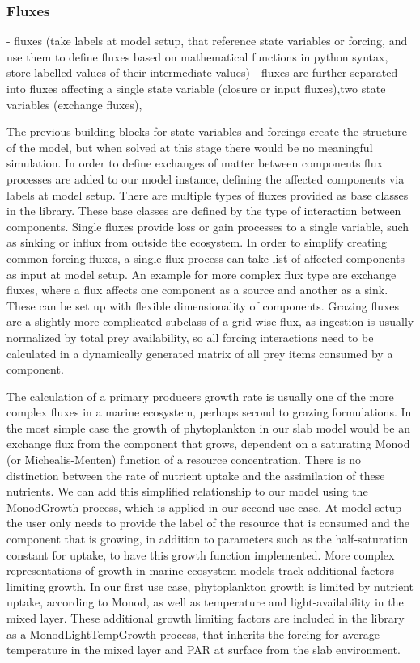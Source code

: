 \documentclass[journal abbreviations, manuscript]{copernicus}
\begin{document}
\subsubsection{Fluxes}

- fluxes (take labels at model setup, that reference state variables or forcing, and use them to define fluxes based on mathematical functions in python syntax, store labelled values of their intermediate values)
    - fluxes are further separated into fluxes affecting a single state variable (closure or input fluxes),two state variables (exchange fluxes),
    
The previous building blocks for state variables and forcings create the structure of the model, but when solved at this stage there would be no meaningful simulation. In order to define exchanges of matter between components flux processes are added to our model instance, defining the affected components via labels at model setup.
There are multiple types of fluxes provided as base classes in the library. These base classes are defined by the type of interaction between components. Single fluxes provide loss or gain processes to a single variable, such as sinking or influx from outside the ecosystem. In order to simplify creating common forcing fluxes, a single flux process can take list of affected components as input at model setup. An example for more complex flux type are exchange fluxes, where a flux affects one component as a source and another as a sink. These can be set up with flexible dimensionality of components. Grazing fluxes are a slightly more complicated subclass of a grid-wise flux, as ingestion is usually normalized by total prey availability, so all forcing interactions need to be calculated in a dynamically generated matrix of all prey items consumed by a component.

The calculation of a primary producers growth rate is usually one of the more complex fluxes in a marine ecosystem, perhaps second to grazing formulations. In the most simple case the growth of phytoplankton in our slab model would be an exchange flux from the component that grows, dependent on a saturating Monod (or Michealis-Menten) function of a resource concentration. There is no distinction between the rate of nutrient uptake and the assimilation of these nutrients. We can add this simplified relationship to our model using the MonodGrowth process, which is applied in our second use case. At model setup the user only needs to provide the label of the resource that is consumed and the component that is growing, in addition to parameters such as the half-saturation constant for uptake, to have this growth function implemented.
More complex representations of growth in marine ecosystem models track additional factors limiting growth. In our first use case, phytoplankton growth is limited by nutrient uptake, according to Monod, as well as temperature and light-availability in the mixed layer. These additional growth limiting factors are included in the library as a MonodLightTempGrowth process, that inherits the forcing for average temperature in the mixed layer and PAR at surface from the slab environment.
\end{document}
